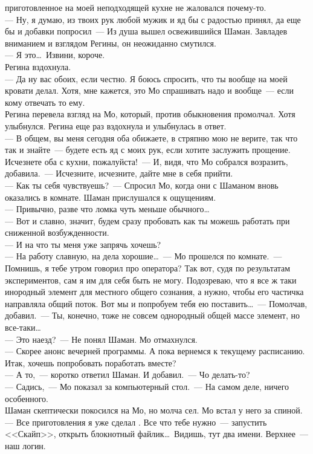 приготовленное на моей неподходящей кухне не жаловался почему-то. \\
--- Ну, я думаю, из твоих рук любой мужик и яд бы с радостью принял, да еще бы и 
добавки попросил~--- Из душа вышел освежившийся Шаман. Завладев вниманием и 
взглядом Регины, он неожиданно смутился.\\
--- Я это\ldots\ Извини, короче.\\
Регина вздохнула. \\
--- Да ну вас обоих, если честно. Я боюсь спросить, что ты вообще на моей кровати 
делал. Хотя, мне кажется, это Мо спрашивать надо и вообще~--- если кому 
отвечать то ему.\\
Регина перевела взгляд на Мо, который, против обыкновения промолчал. Хотя 
улыбнулся. Регина еще раз вздохнула и улыбнулась в ответ.\\
--- В общем, вы меня сегодня оба обижаете, в стряпню мою не верите, так что так и 
знайте~--- будете есть яд с моих рук, если хотите заслужить прощение. Исчезнете 
оба с кухни, пожалуйста!~--- И, видя, что Мо собрался возразить, добавила.~--- 
Исчезните, исчезните, дайте мне в себя прийти.\\
--- Как ты себя чувствуешь?~--- Спросил Мо, когда они с Шаманом вновь оказались в 
комнате. Шаман прислушался к ощущениям.\\
--- Привычно, разве что ломка чуть меньше обычного\ldots\\
--- Вот и славно, значит, будем сразу пробовать как ты можешь работать при 
сниженной возбужденности.\\
--- И на что ты меня уже запрячь хочешь?\\
--- На работу славную, на дела хорошие\ldots~--- Мо прошелся по комнате.~--- 
Помнишь, я тебе утром говорил про оператора? Так вот, судя по результатам экспериментов, 
сам я им для себя быть не могу. Подозреваю, что я все ж таки инородный элемент 
для местного общего сознания, а нужно, чтобы его частичка направляла общий 
поток. Вот мы и попробуем тебя ею поставить\ldots~--- Помолчав, добавил.~--- 
Ты, конечно, тоже не совсем однородный общей массе элемент, но все-таки\ldots\\
--- Это наезд?~--- Не понял Шаман. Мо отмахнулся.\\
--- Скорее анонс вечерней программы. А пока вернемся к текущему расписанию. Итак, 
хочешь попробовать поработать вместе?\\
--- А то,~--- коротко ответил Шаман. И добавил.~--- Чо делать-то?\\
--- Садись,~--- Мо показал за компьютерный стол.~--- На самом деле, ничего 
особенного.\\
Шаман скептически покосился на Мо, но молча сел. Мо встал у него за спиной.\\
--- Все приготовления я уже сделал . Все что тебе нужно~--- запустить <<Скайп>>, 
открыть блокнотный файлик\ldots\ Видишь, тут два имени. Верхнее~--- наш логин.

